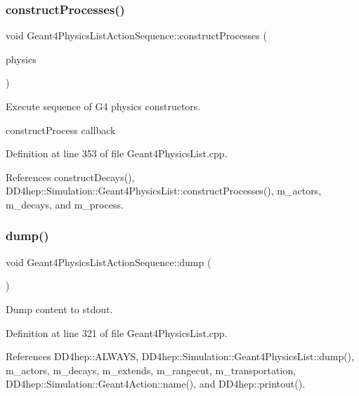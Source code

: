 \subsubsection{\texorpdfstring{construct\+Processes()}{constructProcesses()}}
{\footnotesize\ttfamily void Geant4\+Physics\+List\+Action\+Sequence\+::construct\+Processes (\begin{DoxyParamCaption}\item[{G4\+V\+User\+Physics\+List $\ast$}]{physics }\end{DoxyParamCaption})\hspace{0.3cm}{\ttfamily [virtual]}}



Execute sequence of G4 physics constructors. 

construct\+Process callback 

Definition at line 353 of file Geant4\+Physics\+List.\+cpp.



References construct\+Decays(), D\+D4hep\+::\+Simulation\+::\+Geant4\+Physics\+List\+::construct\+Processes(), m\+\_\+actors, m\+\_\+decays, and m\+\_\+process.

\hypertarget{class_d_d4hep_1_1_simulation_1_1_geant4_physics_list_action_sequence_a15c69e0f4c07f3188c37c7732f6ff6c7}{}\label{class_d_d4hep_1_1_simulation_1_1_geant4_physics_list_action_sequence_a15c69e0f4c07f3188c37c7732f6ff6c7} 
\subsubsection{\texorpdfstring{dump()}{dump()}}
{\footnotesize\ttfamily void Geant4\+Physics\+List\+Action\+Sequence\+::dump (\begin{DoxyParamCaption}{ }\end{DoxyParamCaption})}



Dump content to stdout. 



Definition at line 321 of file Geant4\+Physics\+List.\+cpp.



References D\+D4hep\+::\+A\+L\+W\+A\+YS, D\+D4hep\+::\+Simulation\+::\+Geant4\+Physics\+List\+::dump(), m\+\_\+actors, m\+\_\+decays, m\+\_\+extends, m\+\_\+rangecut, m\+\_\+transportation, D\+D4hep\+::\+Simulation\+::\+Geant4\+Action\+::name(), and D\+D4hep\+::printout().



